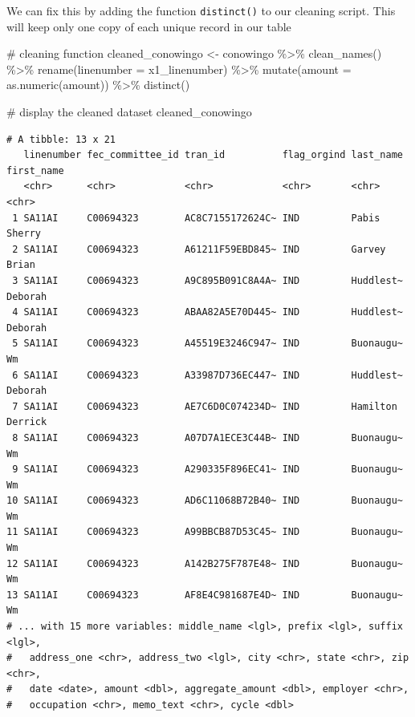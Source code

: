 \documentclass[
  letterpaper,
  DIV=11,
  numbers=noendperiod]{scrreprt}
\newenvironment{Shaded}{\begin{snugshade}}{\end{snugshade}}
\newcommand{\AttributeTok}[1]{\textcolor[rgb]{0.40,0.45,0.13}{#1}}
\newcommand{\CommentTok}[1]{\textcolor[rgb]{0.37,0.37,0.37}{#1}}
\newcommand{\FunctionTok}[1]{\textcolor[rgb]{0.28,0.35,0.67}{#1}}
\newcommand{\NormalTok}[1]{\textcolor[rgb]{0.00,0.23,0.31}{#1}}
\newcommand{\OtherTok}[1]{\textcolor[rgb]{0.00,0.23,0.31}{#1}}
\newcommand{\SpecialCharTok}[1]{\textcolor[rgb]{0.37,0.37,0.37}{#1}}
\begin{document}
We can fix this by adding the function \texttt{distinct()} to our
cleaning script. This will keep only one copy of each unique record in
our table

\begin{Shaded}
\begin{Highlighting}[]
\CommentTok{\# cleaning function}
\NormalTok{cleaned\_conowingo }\OtherTok{\textless{}{-}}\NormalTok{ conowingo }\SpecialCharTok{\%\textgreater{}\%}
  \FunctionTok{clean\_names}\NormalTok{() }\SpecialCharTok{\%\textgreater{}\%} 
  \FunctionTok{rename}\NormalTok{(}\AttributeTok{linenumber =}\NormalTok{ x1\_linenumber) }\SpecialCharTok{\%\textgreater{}\%} 
  \FunctionTok{mutate}\NormalTok{(}\AttributeTok{amount =} \FunctionTok{as.numeric}\NormalTok{(amount)) }\SpecialCharTok{\%\textgreater{}\%} 
  \FunctionTok{distinct}\NormalTok{()}
  

\CommentTok{\# display the cleaned dataset}
\NormalTok{cleaned\_conowingo}
\end{Highlighting}
\end{Shaded}

\begin{verbatim}
# A tibble: 13 x 21
   linenumber fec_committee_id tran_id          flag_orgind last_name first_name
   <chr>      <chr>            <chr>            <chr>       <chr>     <chr>     
 1 SA11AI     C00694323        AC8C7155172624C~ IND         Pabis     Sherry    
 2 SA11AI     C00694323        A61211F59EBD845~ IND         Garvey    Brian     
 3 SA11AI     C00694323        A9C895B091C8A4A~ IND         Huddlest~ Deborah   
 4 SA11AI     C00694323        ABAA82A5E70D445~ IND         Huddlest~ Deborah   
 5 SA11AI     C00694323        A45519E3246C947~ IND         Buonaugu~ Wm        
 6 SA11AI     C00694323        A33987D736EC447~ IND         Huddlest~ Deborah   
 7 SA11AI     C00694323        AE7C6D0C074234D~ IND         Hamilton  Derrick   
 8 SA11AI     C00694323        A07D7A1ECE3C44B~ IND         Buonaugu~ Wm        
 9 SA11AI     C00694323        A290335F896EC41~ IND         Buonaugu~ Wm        
10 SA11AI     C00694323        AD6C11068B72B40~ IND         Buonaugu~ Wm        
11 SA11AI     C00694323        A99BBCB87D53C45~ IND         Buonaugu~ Wm        
12 SA11AI     C00694323        A142B275F787E48~ IND         Buonaugu~ Wm        
13 SA11AI     C00694323        AF8E4C981687E4D~ IND         Buonaugu~ Wm        
# ... with 15 more variables: middle_name <lgl>, prefix <lgl>, suffix <lgl>,
#   address_one <chr>, address_two <lgl>, city <chr>, state <chr>, zip <chr>,
#   date <date>, amount <dbl>, aggregate_amount <dbl>, employer <chr>,
#   occupation <chr>, memo_text <chr>, cycle <dbl>
\end{verbatim}
\end{document}
